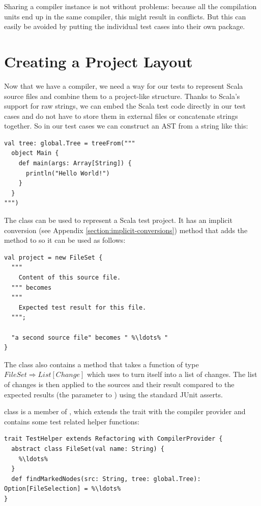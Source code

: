 \documentclass[10pt,a4paper,oneside]{scrreprt}
\begin{document}
Sharing a compiler instance is not without problems: because all the compilation units end up in the same compiler, this might result in conflicts. But this can easily be avoided by putting the individual test cases into their own package.

\section{Creating a Project Layout}

Now that we have a compiler, we need a way for our tests to represent Scala source files and combine them to a project-like structure. Thanks to Scala's support for raw strings, we can embed the Scala test code directly in our test cases and do not have to store them in external files or concatenate strings together. So in our test cases we can construct an AST from a string like this:

\begin{lstlisting}
val tree: global.Tree = treeFrom("""
  object Main {
    def main(args: Array[String]) {
      println("Hello World!")
    }
  }
""")
\end{lstlisting}

The  class can be used to represent a Scala test project. It has an implicit conversion (see Appendix \vref{section:implicit-conversions}) method that adds the  method to  so it can be used as follows:

\begin{lstlisting}
val project = new FileSet {
  """
    Content of this source file.
  """ becomes
  """
    Expected test result for this file.
  """;

  "a second source file" becomes " %\ldots% "
}
\end{lstlisting}

The  class also contains a method  that takes a function of type $FileSet \Rightarrow List[Change]$ which  uses to turn itself into a list of changes. The list of changes is then applied to the sources and their result compared to the expected results (the parameter to ) using the standard JUnit asserts.

 class is a member of , which extends the  trait with the compiler provider and contains some test related helper functions:

\begin{lstlisting}
trait TestHelper extends Refactoring with CompilerProvider {
  abstract class FileSet(val name: String) {
    %\ldots%
  }
  def findMarkedNodes(src: String, tree: global.Tree): Option[FileSelection] = %\ldots%
}
\end{lstlisting}
\end{document}
